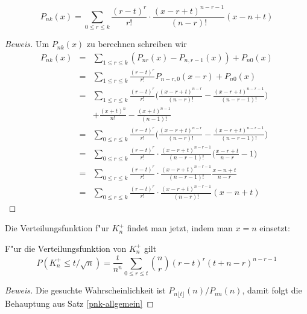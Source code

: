 \begin{satz}\label{pnk-allgemein}
\begin{equation}
P_{nk}(x)
=
\sum_{0\le r\le k}\frac{(r-t)^r}{r!}
\cdot
\frac{(x-r+t)^{n-r-1}}{(n-r)!}
(x-n+t)
\end{equation}
\end{satz}
\begin{proof}[Beweis]
Um $P_{nk}(x)$ zu berechnen schreiben wir
\begin{eqnarray*}
P_{nk}(x)
&=&\sum_{1\le r\le k}(P_{nr}(x)-P_{n,r-1}(x))+P_{n0}(x)\\
&=&\sum_{1\le r\le k}\frac{(r-t)^r}{r!}P_{n-r,0}(x-r)+P_{n0}(x)\\
&=&\sum_{1\le r\le k}\frac{(r-t)^r}{r!}\biggl(
\frac{(x-r+t)^{n-r}}{(n-r)!}-
\frac{(x-r+t)^{n-r-1}}{(n-r-1)!}\biggr)\\
&&+\frac{(x+t)^{n}}{n!}- \frac{(x+t)^{n-1}}{(n-1)!}\\
&=&\sum_{0\le r\le k}\frac{(r-t)^r}{r!}\biggl(
\frac{(x-r+t)^{n-r}}{(n-r)!}-
\frac{(x-r+t)^{n-r-1}}{(n-r-1)!}\biggr)\\
&=&\sum_{0\le r\le k}\frac{(r-t)^r}{r!}
\cdot
\frac{(x-r+t)^{n-r-1}}{(n-r-1)!}
\biggl( \frac{x-r+t}{n-r}-1 \biggr)\\
&=&\sum_{0\le r\le k}\frac{(r-t)^r}{r!}
\cdot
\frac{(x-r+t)^{n-r-1}}{(n-r-1)!}
\frac{x-n+t}{n-r}\\
&=&\sum_{0\le r\le k}\frac{(r-t)^r}{r!}
\cdot
\frac{(x-r+t)^{n-r-1}}{(n-r)!}
(x-n+t)
\end{eqnarray*}
\end{proof}
Die Verteilungsfunktion f"ur $K_n^+$ findet man jetzt, indem man $x=n$
einsetzt:

\begin{satz}\label{kn-verteilung}
F"ur die Verteilungsfunktion von $K_n^+$ gilt
\begin{equation}
P(K_n^+\le t/\sqrt{n})=\frac{t}{n^n}\sum_{0\le r\le t}\binom{n}{r}(r-t)^r(t+n-r)^{n-r-1}
\end{equation}
\end{satz}
\begin{proof}[Beweis]
Die gesuchte Wahrscheinlichkeit ist $P_{n\lfloor t\rfloor}(n)/P_{nn}(n)$,
damit folgt die Behauptung aus Satz \ref{pnk-allgemein}
\end{proof}

